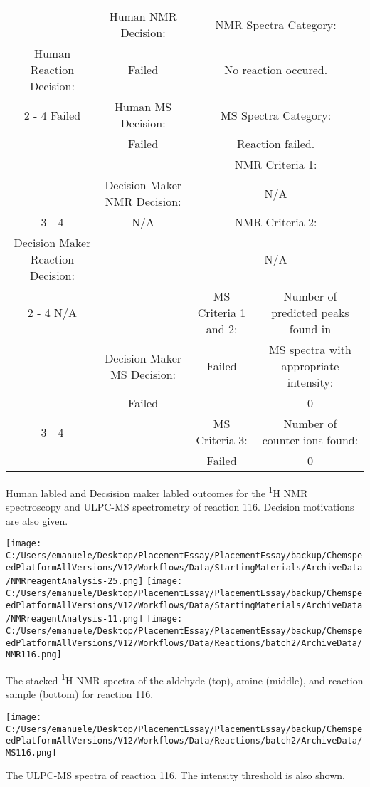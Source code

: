 \documentclass{article}%
\begin{document}
\begin{Decision Table}[H]%
\begin{tabular}{|c|c|c|c|}%
\hline%
&Human NMR Decision:&\multicolumn{2}{|c|}{NMR Spectra Category:}\\%
Human Reaction Decision:&Failed&\multicolumn{2}{|c|}{No reaction occured.}\\%
\cline{2%
-%
4}%
Failed&Human MS Decision:&\multicolumn{2}{|c|}{MS Spectra Category:}\\%
&Failed&\multicolumn{2}{|c|}{Reaction failed.}\\%
\hline%
&&\multicolumn{2}{|c|}{NMR Criteria 1:}\\%
&Decision Maker NMR Decision:&\multicolumn{2}{|c|}{N/A}\\%
\cline{3%
-%
4}%
&N/A&\multicolumn{2}{|c|}{NMR Criteria 2:}\\%
Decision Maker Reaction Decision:&&\multicolumn{2}{|c|}{N/A}\\%
\cline{2%
-%
4}%
N/A&&MS Criteria 1 and 2:&Number of predicted peaks found in\\%
&Decision Maker MS Decision:&Failed&MS spectra with appropriate intensity:\\%
&Failed&&0\\%
\cline{3%
-%
4}%
&&MS Criteria 3:&Number of counter{-}ions found:\\%
&&Failed&0\\%
\hline%
\end{tabular}%
\caption{Human labled and Decsision maker labled outcomes for the \textsuperscript{1}H NMR spectroscopy and ULPC-MS spectrometry of reaction 116. Decision motivations are also given.}%
\end{Decision Table}%
\begin{NMR Spectra}[H]%
\begin{center}%
\texttt{[image: C:/Users/emanuele/Desktop/PlacementEssay/PlacementEssay/backup/ChemspeedPlatformAllVersions/V12/Workflows/Data/StartingMaterials/ArchiveData/NMRreagentAnalysis-25.png]}\hfill%
\texttt{[image: C:/Users/emanuele/Desktop/PlacementEssay/PlacementEssay/backup/ChemspeedPlatformAllVersions/V12/Workflows/Data/StartingMaterials/ArchiveData/NMRreagentAnalysis-11.png]}\hfill%
\texttt{[image: C:/Users/emanuele/Desktop/PlacementEssay/PlacementEssay/backup/ChemspeedPlatformAllVersions/V12/Workflows/Data/Reactions/batch2/ArchiveData/NMR116.png]}\hfill%
\end{center}%
\caption{The stacked \textsuperscript{1}H NMR spectra of the aldehyde (top), amine (middle), and reaction sample (bottom) for reaction 116.}%
\end{NMR Spectra}%
\begin{MS Spectra}[H]%
\begin{center}%
\texttt{[image: C:/Users/emanuele/Desktop/PlacementEssay/PlacementEssay/backup/ChemspeedPlatformAllVersions/V12/Workflows/Data/Reactions/batch2/ArchiveData/MS116.png]}\hfill%
\end{center}%
\caption{The ULPC-MS spectra of reaction 116. The intensity threshold is also shown.}%
\end{MS Spectra}%
\end{document}
